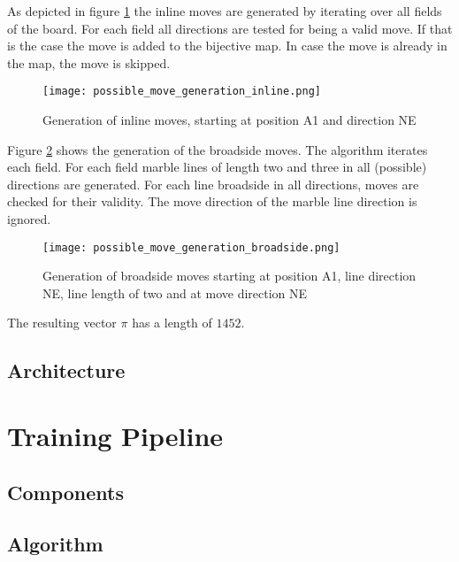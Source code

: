 \begin{enumerate}
          As depicted in figure \ref{possible_move_generation_inline} the inline moves are generated by iterating over all fields of the board. For each field all directions are tested for being a valid move. If that is the case the move is added to the bijective map. In case the move is already in the map, the move is skipped.

          \begin{figure}
              \centering
              \texttt{[image: possible\_move\_generation\_inline.png]}
              \caption{Generation of inline moves, starting at position A1 and direction NE}
              \label{possible_move_generation_inline}
          \end{figure}

          Figure \ref{possible_move_generation_broadside} shows the generation of the broadside moves. The algorithm iterates each field. For each field marble lines of length two and three in all (possible) directions are generated. For each line broadside in all directions, moves are checked for their validity. The move direction of the marble line direction is ignored.

          \begin{figure}
              \centering
              \texttt{[image: possible\_move\_generation\_broadside.png]}
              \caption{Generation of broadside moves starting at position A1, line direction NE, line length of two and at move direction NE}
              \label{possible_move_generation_broadside}
          \end{figure}

          The resulting vector $\pi$ has a length of $1452$.
\end{enumerate}

\subsection{Architecture}
\section{Training Pipeline}
\subsection{Components}
\label{components}
\subsection{Algorithm}


